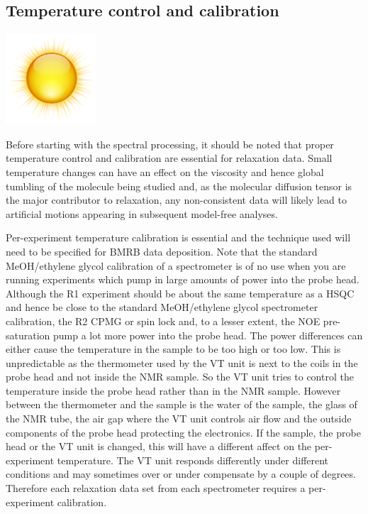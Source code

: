 \subsection{Temperature control and calibration} \label{sect: temperature control and calibration}

\includegraphics[bb=0 0 18 18]{graphics/oxygen_icons/128x128/status/weather-clear}

Before starting with the spectral processing, it should be noted that proper temperature control and calibration are essential for relaxation data.
Small temperature changes can have an effect on the viscosity and hence global tumbling of the molecule being studied and, as the molecular diffusion tensor is the major contributor to relaxation, any non-consistent data will likely lead to artificial motions appearing in subsequent model-free analyses.

Per-experiment temperature calibration is essential and the technique used will need to be specified for BMRB data deposition.
Note that the standard MeOH/ethylene glycol calibration of a spectrometer is of no use when you are running experiments which pump in large amounts of power into the probe head.
Although the R1 experiment should be about the same temperature as a HSQC and hence be close to the standard MeOH/ethylene glycol spectrometer calibration, the R2 CPMG or spin lock and, to a lesser extent, the NOE pre-saturation pump a lot more power into the probe head.
The power differences can either cause the temperature in the sample to be too high or too low.
This is unpredictable as the thermometer used by the VT unit is next to the coils in the probe head and not inside the NMR sample.
So the VT unit tries to control the temperature inside the probe head rather than in the NMR sample.
However between the thermometer and the sample is the water of the sample, the glass of the NMR tube, the air gap where the VT unit controls air flow and the outside components of the probe head protecting the electronics.
If the sample, the probe head or the VT unit is changed, this will have a different affect on the per-experiment temperature.
The VT unit responds differently under different conditions and may sometimes over or under compensate by a couple of degrees.
Therefore each relaxation data set from each spectrometer requires a per-experiment calibration.

